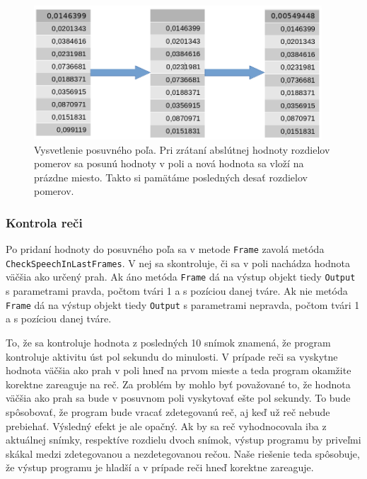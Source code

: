 \begin{figure}[H]
	\begin{center}
		\includegraphics[height=5cm]{pics/vysvetleniePosuvnehoPola.png}
		\caption{Vysvetlenie posuvného poľa.
		Pri zrátaní abslútnej hodnoty rozdielov pomerov sa posunú hodnoty v poli a nová hodnota sa vloží na prázdne miesto. 
		Takto si pamätáme posledných desať rozdielov pomerov.}
		\label{pic-vysvetleniePosuvnehoPola}
	\end{center}
\end{figure}

\subsubsection{Kontrola reči}\label{kontrolaReci}
Po pridaní hodnoty do posuvného poľa sa v metode \texttt{Frame} zavolá metóda \texttt{Check\-Speech\-InLastFrames}.
V nej sa skontroluje, či sa v poli nachádza hodnota väčšia ako určený prah.
Ak áno metóda \texttt{Frame} dá na výstup objekt tiedy \texttt{Output} s parametrami pravda, počtom tvári 1 a s pozíciou danej tváre.
Ak nie metóda \texttt{Frame} dá na výstup objekt tiedy \texttt{Output} s parametrami nepravda, počtom tvári 1 a s pozíciou danej tváre.

To, že sa kontroluje hodnota z posledných 10 snímok znamená, že program kontroluje aktivitu úst pol sekundu do minulosti.
V prípade reči sa vyskytne hodnota väčšia ako prah v poli hneď na prvom mieste a teda program okamžite korektne zareaguje na reč. 
Za problém by mohlo byť považované to, že hodnota väčšia ako prah sa bude v posuvnom poli vyskytovať ešte pol sekundy.
To bude spôsobovať, že program bude vracať zdetegovanú reč, aj keď už reč nebude prebiehať.
Výsledný efekt je ale opačný. 
Ak by sa reč vyhodnocovala iba z aktuálnej snímky, respektíve rozdielu dvoch snímok, výstup programu by priveľmi skákal medzi zdetegovanou a nezdetegovanou rečou.
Naše riešenie teda spôsobuje, že výstup programu je hladší a v prípade reči hneď korektne zareaguje.


